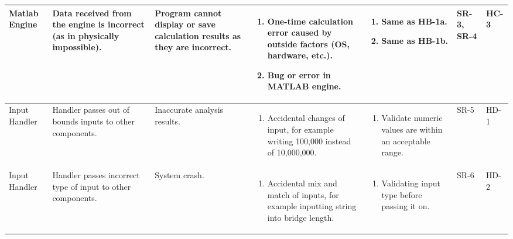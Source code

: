 \documentclass{article}
\begin{document}
\begin{landscape}
\begin{longtable}{|p{} | p{} | p{} | p{} | p{} | p{} | p{}|}
  \hline

  Matlab Engine & Data received from the engine is incorrect (as in physically impossible). &
  Program cannot display or save calculation results as they are incorrect. &
  \begin{enumerate}[leftmargin=*, label={\alph*.}, itemsep=1pt, topsep=0pt, partopsep=0pt] 
    \item One-time calculation error caused by outside factors (OS, hardware, etc.).
    \item Bug or error in MATLAB engine.  
  \end{enumerate} &
  \begin{enumerate}[leftmargin=*, label={\alph*.}, itemsep=1pt, topsep=0pt, partopsep=0pt] 
    \item Same as HB-1a.
    \item Same as HB-1b.
  \end{enumerate}& 
  SR-3, SR-4 & HC-3 \\

  \hline

  Input Handler & Handler passes out of bounds inputs to other components. &
  Inaccurate analysis results. &
  \begin{enumerate}[leftmargin=*, label={\alph*.}, itemsep=1pt, topsep=0pt, partopsep=0pt] 
      \item Accidental changes of input, for example writing 100,000 instead of 10,000,000.
  \end{enumerate} &
  \begin{enumerate}[leftmargin=*, label={\alph*.}, itemsep=1pt, topsep=0pt, partopsep=0pt] 
    \item Validate numeric values are within an acceptable range.
  \end{enumerate} &
  SR-5 & HD-1 \\

  \hline

  Input Handler & Handler passes incorrect type of input to other components. & System crash. &
  \begin{enumerate}[leftmargin=*, label={\alph*.}, itemsep=1pt, topsep=0pt, partopsep=0pt] 
      \item Accidental mix and match of inputs, for example inputting string into bridge length.
  \end{enumerate} &
  \begin{enumerate}[leftmargin=*, label={\alph*.}, itemsep=1pt, topsep=0pt, partopsep=0pt] 
    \item Validating input type before passing it on.
  \end{enumerate} &
  SR-6 & HD-2 \\


\end{longtable}
\end{landscape}
\end{document}
